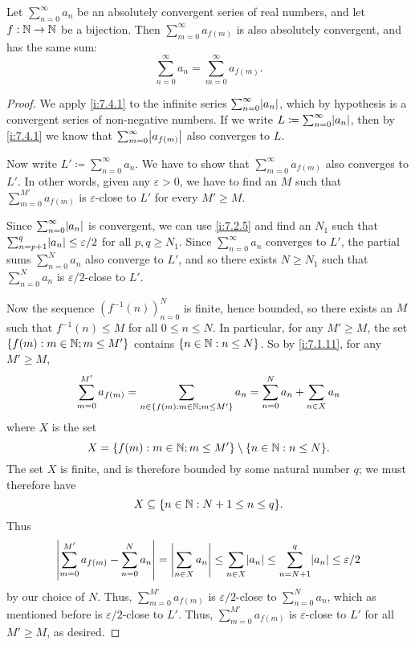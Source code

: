 \setcounter{thm}{2}
\begin{prop}\label{i:7.4.3}
  Let \(\sum_{n = 0}^\infty a_n\) be an absolutely convergent series of real numbers, and let \(f : \mathbb{N} \to \mathbb{N}\) be a bijection.
  Then \(\sum_{m = 0}^\infty a_{f(m)}\) is also absolutely convergent, and has the same sum:
  \[
    \sum_{n = 0}^\infty a_n = \sum_{m = 0}^\infty a_{f(m)}.
  \]
\end{prop}

\begin{proof}
  We apply \cref{i:7.4.1} to the infinite series \(\sum_{n = 0}^\infty \abs{a_n}\), which by hypothesis is a convergent series of non-negative numbers.
  If we write \(L \coloneqq \sum_{n = 0}^\infty \abs{a_n}\), then by \cref{i:7.4.1} we know that \(\sum_{m = 0}^\infty \abs{a_{f(m)}}\) also converges to \(L\).

  Now write \(L' \coloneqq \sum_{n = 0}^\infty a_n\).
  We have to show that \(\sum_{m = 0}^\infty a_{f(m)}\) also converges to \(L'\).
  In other words, given any \(\varepsilon > 0\), we have to find an \(M\) such that \(\sum_{m = 0}^{M'} a_{f(m)}\) is \(\varepsilon\)-close to \(L'\) for every \(M' \geq M\).

  Since \(\sum_{n = 0}^\infty \abs{a_n}\) is convergent, we can use \cref{i:7.2.5} and find an \(N_1\) such that \(\sum_{n = p + 1}^q \abs{a_n} \leq \varepsilon / 2\) for all \(p, q \geq N_1\).
  Since \(\sum_{n = 0}^\infty a_n\) converges to \(L'\), the partial sums \(\sum_{n = 0}^N a_n\) also converge to \(L'\), and so there exists \(N \geq N_1\) such that \(\sum_{n = 0}^N a_n\) is \(\varepsilon / 2\)-close to \(L'\).

  Now the sequence \((f^{-1}(n))_{n = 0}^N\) is finite, hence bounded, so there exists an \(M\) such that \(f^{-1}(n) \leq M\) for all \(0 \leq n \leq N\).
  In particular, for any \(M' \geq M\), the set \(\left\lbrace f(m) : m \in \mathbb{N}; m \leq M'\right\rbrace\) contains \(\left\lbrace n \in \mathbb{N} : n \leq N\right\rbrace\).
  So by \cref{i:7.1.11}, for any \(M' \geq M\),
  \[
    \sum_{m = 0}^{M'} a_{f(m)} = \sum_{n \in \left\lbrace f(m) : m \in \mathbb{N}; m \leq M'\right\rbrace} a_n = \sum_{n = 0}^N a_n + \sum_{n \in X} a_n
  \]
  where \(X\) is the set
  \[
    X = \set{f(m) : m \in \N; m \leq M'} \setminus \set{n \in \N : n \leq N}.
  \]
  The set \(X\) is finite, and is therefore bounded by some natural number \(q\);
  we must therefore have
  \[
    X \subseteq \set{n \in \N : N + 1 \leq n \leq q}.
  \]
  Thus
  \[
    \abs{\sum_{m = 0}^{M'} a_{f(m)} - \sum_{n = 0}^N a_n} = \abs{\sum_{n \in X} a_n} \leq \sum_{n \in X} \abs{a_n} \leq \sum_{n = N + 1}^q \abs{a_n} \leq \varepsilon / 2
  \]
  by our choice of \(N\).
  Thus, \(\sum_{m = 0}^{M'} a_{f(m)}\) is \(\varepsilon / 2\)-close to \(\sum_{n = 0}^N a_n\), which as mentioned before is \(\varepsilon / 2\)-close to \(L'\).
  Thus, \(\sum_{m = 0}^{M'} a_{f(m)}\) is \(\varepsilon\)-close to \(L'\) for all \(M' \geq M\), as desired.
\end{proof}

